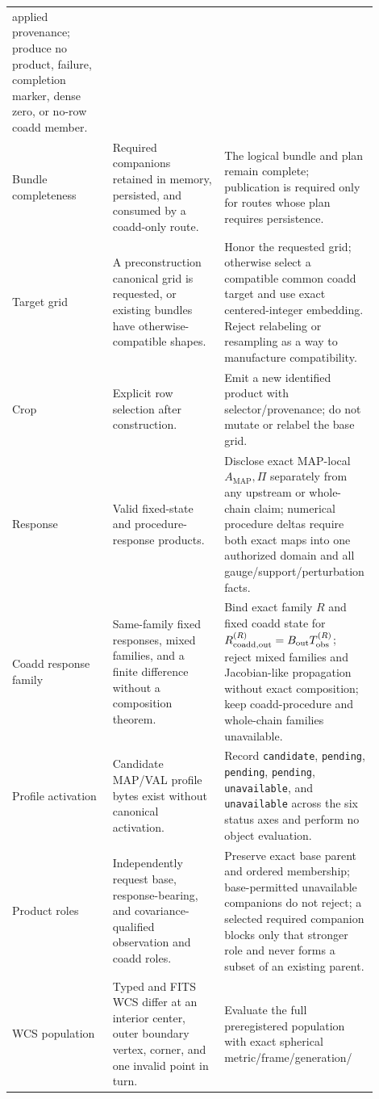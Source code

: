 \documentclass[10pt]{article}
\begin{document}
\begin{longtable}{L{0.27\linewidth}L{0.30\linewidth}L{0.33\linewidth}}
applied provenance; produce no
product, failure, completion marker, dense zero, or no-row coadd member.\\
Bundle completeness & Required companions retained in memory, persisted, and
consumed by a coadd-only route. & The logical bundle and plan remain complete;
publication is required only for routes whose plan requires persistence.\\
Target grid & A preconstruction canonical grid is requested, or existing
bundles have otherwise-compatible shapes. & Honor the requested grid; otherwise
select a compatible common coadd target and use exact centered-integer
embedding.  Reject relabeling or resampling as a way to manufacture
compatibility.\\
Crop & Explicit row selection after construction. & Emit a new identified
product with selector/provenance; do not mutate or relabel the base grid.\\
Response & Valid fixed-state and procedure-response products. & Disclose exact
MAP-local \(A_{\mathrm{MAP}},\Pi\) separately from any upstream or whole-chain
claim; numerical procedure deltas require both exact maps into one authorized
\SCIMapComparisonSpaceRecordId{} domain and all
gauge/support/perturbation facts.\\
Coadd response family & Same-family fixed responses, mixed families, and a
finite difference without a composition theorem. & Bind exact family \(R\) and
fixed coadd state for \(R_{\rm coadd,out}^{(R)}=B_{\rm out}T_{\rm obs}^{(R)}\);
reject mixed families and Jacobian-like propagation without exact composition;
keep coadd-procedure and whole-chain families unavailable.\\
Profile activation & Candidate MAP/VAL profile bytes exist without canonical
activation. & Record \texttt{candidate}, \texttt{pending}, \texttt{pending},
\texttt{pending}, \texttt{unavailable}, and \texttt{unavailable} across the
six status axes and perform no object evaluation.\\
Product roles & Independently request base, response-bearing, and
covariance-qualified observation and coadd roles. & Preserve exact base parent
and ordered membership; base-permitted unavailable companions do not reject;
a selected required companion blocks only that stronger role and never forms a
subset of an existing parent.\\
WCS population & Typed and FITS WCS differ at an interior center, outer
boundary vertex, corner, and one invalid point in turn. & Evaluate the full
preregistered population with exact spherical metric/frame/generation/

\end{longtable}
\end{document}

